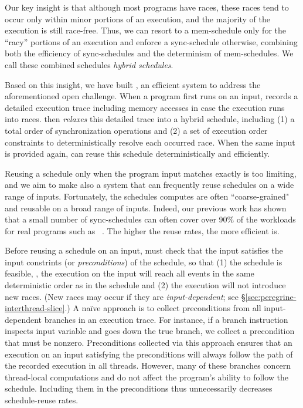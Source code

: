 Our key insight is that although most programs have races, these races
tend to occur only within minor portions of an execution, and the majority
of the execution is still race-free.  Thus, we can resort to a
mem-schedule only for the ``racy'' portions of an execution and enforce a
sync-schedule otherwise, combining both the efficiency of sync-schedules
and the determinism of mem-schedules. We call these combined schedules
\emph{hybrid schedules}.

Based on this insight, we have built \peregrine, an efficient \dmt
system to address the aforementioned open challenge.
When a program first runs on an input, \peregrine records a detailed execution
trace including memory accesses in case the execution runs into races.
\peregrine then \emph{relaxes} this detailed trace into a hybrid schedule,
including (1) a total order of synchronization operations and (2) a set of
execution order constraints to deterministically resolve each occurred race. 
When the same input is provided again, \peregrine can reuse this schedule
deterministically and efficiently.

Reusing a schedule only when the program input matches exactly is too
limiting, and we aim to make \peregrine also a \smt system that can frequently
reuse schedules on a wide range of inputs.  Fortunately, the schedules
\peregrine computes are often
``coarse-grained" and reusable on a broad range of inputs.  Indeed, our
previous work has shown that a small number of sync-schedules can often cover
over 90\% of the workloads for real programs such as
\apache~\cite{cui:tern:osdi10}.  The higher the reuse rates, the more efficient
\peregrine is.


Before reusing a schedule on an input, \peregrine must check that the input
satisfies the input constrints (or \emph{preconditions}) of the schedule, so
that (1) the schedule is feasible, \ie, the execution on the input will reach
all events in the same deterministic order as in the schedule and (2) the
execution will not introduce new races. (New races may occur if they are
\emph{input-dependent}; see \S\ref{sec:peregrine-interthread-slice}.)  A na\"ive
approach is to collect preconditions from all input-dependent branches in
an execution trace.  For instance, if a branch instruction inspects
input variable  and goes down the true branch, we collect a
precondition that  must be nonzero.  Preconditions collected via
this approach ensures that an execution on an input satisfying the
preconditions will always follow the path of the recorded execution in all
threads.  However, many of these branches concern thread-local
computations and do not affect the program's ability to follow the
schedule. Including them in the preconditions thus unnecessarily decreases
schedule-reuse rates.

